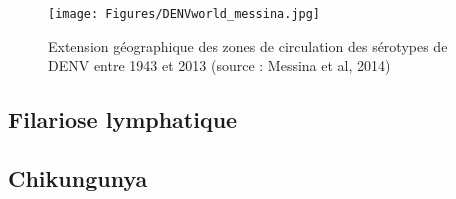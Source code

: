 \begin{figure}[t]
	\centering
	\texttt{[image: Figures/DENVworld\_messina.jpg]}
	\caption{Extension géographique des zones de circulation des sérotypes de DENV entre 1943 et 2013 (source : Messina et al, 2014)}
	\label{fig:denvworld}
\end{figure}




\subsection{Filariose lymphatique}

\subsection{Chikungunya}

%



